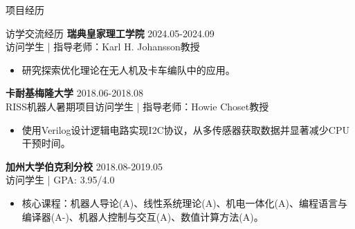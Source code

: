 \documentclass{resume} %
\newcommand{\trianglebullet}{$\mbox{\ensuremath{\rhd}}$}
\begin{document}
\begin{rSection}{项目经历}
\end{rSection}

\newpage
\begin{rSection}{访学交流经历}
    \textbf{瑞典皇家理工学院}  \hfill {2024.05-2024.09}
    \\ 访问学生 | 指导老师：Karl H. Johansson教授
    \begin{itemize}
        \item 研究探索优化理论在无人机及卡车编队中的应用。
    \end{itemize}

    \textbf{卡耐基梅隆大学} \hfill {2018.06-2018.08} 
    \\ RISS机器人暑期项目访问学生 | 指导老师：Howie Choset教授
    \begin{itemize}
        \item 使用Verilog设计逻辑电路实现I2C协议，从多传感器获取数据并显著减少CPU干预时间。
    \end{itemize}
    \textbf{加州大学伯克利分校}  \hfill {2018.08-2019.05} 
    \\ 访问学生 | GPA: 3.95/4.0 
    \begin{itemize}
        \item 核心课程：机器人导论(A)、线性系统理论(A)、机电一体化(A)、编程语言与编译器(A-)、机器人控制与交互(A)、数值计算方法(A)。
    \end{itemize}
\end{rSection}
\end{document}
